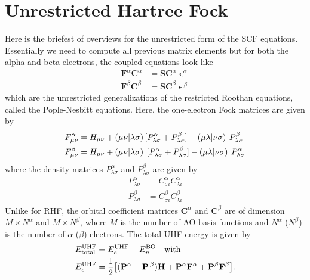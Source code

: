\documentclass[11pt]{article}
\begin{document}
\section{Unrestricted Hartree Fock}
Here is the briefest of overviews for the unrestricted form of the SCF equations. Essentially we need to compute all previous matrix elements but for both the alpha and beta electrons, the coupled equations look like
\begin{align}
\mathbf{F}^{\alpha}\mathbf{C}^{\alpha} &= \mathbf{SC}^{\alpha}{\bm{\upvarepsilon}}^{\alpha} \\
\mathbf{F}^{\beta}\mathbf{C}^{\beta} &= \mathbf{SC}^{\beta}{\bm{\upvarepsilon}}^{\,\beta}
\end{align}
which are the unrestricted generalizations of the restricted Roothan equations, called the Pople-Nesbitt equations. Here, the one-electron Fock matrices are given by
\begin{align}
F_{\mu\nu}^{\alpha} &= H_{\mu\nu} + (\mu\nu|\lambda\sigma)\,[P_{\lambda\sigma}^{\alpha} + P_{\lambda\sigma}^{\beta}] - \left(\mu\lambda\middle|\nu\sigma\right)\: P_{\lambda\sigma}^{\beta}\\
F_{\mu\nu}^{\beta} &= H_{\mu\nu} + \left(\mu\nu\middle|\lambda\sigma\right)\:[P_{\lambda\sigma}^{\alpha} + P_{\lambda\sigma}^{\beta}] - \left(\mu\lambda\middle|\nu\sigma\right)\:P_{\lambda\sigma}^{\alpha}
\end{align}
where the density matrices $P_{\lambda\sigma}^{\alpha}$ and $P_{\lambda\sigma}^{\beta}$ are given by
\begin{align}
P_{\lambda\sigma}^{\alpha} &= C_{\sigma i}^{\alpha}C_{\lambda i}^{\alpha}\\
P_{\lambda\sigma}^{\beta} &= C_{\sigma i}^{\beta}C_{\lambda i}^{\beta}
\end{align}
Unlike for RHF, the orbital coefficient matrices $\mathbf{C}^{\alpha}$ and $\mathbf{C}^{\beta}$ are of dimension $M\times N^{\alpha}$ and $M\times N^{\beta}$, where $M$ is the number of AO basis functions and $N^{\alpha}$ ($N^{\beta}$) is the number of $\alpha$ ($\beta$) electrons.  The total UHF energy is given by
\begin{align}
E^{\text{UHF}}_{\text{total}} &= E^{\text{UHF}}_{e} + E^{\text{BO}}_{n}\qq{with}\\
E^{\text{UHF}}_{e} &= \frac{1}{2}\qty[(\mathbf{P}^{\alpha} + \mathbf{P}^{\,\beta}){\bf H} + 
\mathbf{P}^{\alpha}\mathbf{F}^{\alpha} + \mathbf{P}^{\beta}\mathbf{F}^{\beta}].
\end{align}
\end{document}
